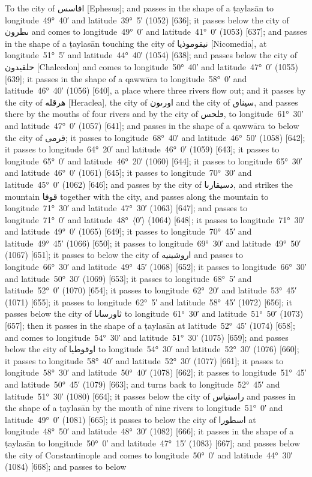 \documentclass[11pt]{article}
\newcommand{\Pg}[1]{\marginpar{\footnotesize #1}}
\newcommand{\Ang}[1]{\ensuremath{#1}}
\begin{document}
To the city of \textarabic{افاسس} [Ephesus]; and passes in the shape of a ṭaylasān to longitude~49°~40′ and latitude~39°~5′ (1052) [636]; it passes below the city of \textarabic{ٮطرون} and comes to longitude~49°~0′ and latitude~41°~0′ (1053) [637]; and passes in the shape of a ṭaylasān touching the city of \textarabic{نيقوموذيا} [Nicomedia], at longitude~51°~5′ and latitude~44°~40′ (1054) [638]; and passes below the city of \textarabic{حلقيدون} [Chalcedon] and comes to longitude~50°~40′ and latitude~47°~0′ (1055) [639]; it passes in the shape of a qawwāra to longitude~58°~0′ and latitude~46°~40′ (1056) [640]\Pg{p. 71}, a place where three rivers flow out; and it passes by the city of \textarabic{هرقله} [Heraclea], the city of \textarabic{اورٮون} and the city of \textarabic{سيناٯ}, and passes there by the mouths of four rivers and by the city of \textarabic{ڡلحس}, to longitude~61°~30′ and latitude~47°~0′ (1057) [641]; and passes in the shape of a qawwāra to below the city of \textarabic{قرمى}; it passes to longitude~68°~40′ and latitude~46°~50′ (1058) [642]; it passes to longitude~64°~20′ and latitude~46°~0′ (1059) [643]; it passes to longitude~65°~0′ and latitude~46°~20′ (1060) [644]; it passes to longitude~65°~30′ and latitude~46°~0′ (1061) [645]; it passes to longitude~70°~30′ and latitude~45°~0′ (1062) [646]; and passes by the city of \textarabic{دسيقارٮا}, and strikes the mountain \textarabic{قوفا} together with the city, and passes along the mountain to longitude~71°~30′ and latitude~47°~30′ (1063) [647]; and passes to longitude~71°~0′ and latitude~48°~\Ang{\langle}0′\Ang{\rangle} (1064) [648]; it passes to longitude~71°~30′ and latitude~49°~0′ (1065) [649]; it passes to longitude~70°~45′ and latitude~49°~45′ (1066) [650]; it passes to longitude~69°~30′ and latitude~49°~50′ (1067) [651]; it passes to below the city of \textarabic{اروشينيه} and passes to longitude~66°~30′ and latitude~49°~45′ (1068) [652]; it passes to longitude~66°~30′ and latitude~50°~30′ (1069) [653]; it passes to longitude~68°~5′ and latitude~52°~0′ (1070) [654]; it passes to longitude~62°~20′ and latitude~53°~45′ (1071) [655]; it passes to longitude~62°~5′ and latitude~58°~45′ (1072) [656]; it passes below the city of \textarabic{ثاورسانا} to longitude~61°~30′ and latitude~51°~50′ (1073) [657]; then it passes in the shape of a ṭaylasān at latitude~52°~45′ (1074) [658]; and comes to longitude~54°~30′ and latitude~51°~30′ (1075) [659]; and passes below the city of \textarabic{اوقوطيا} to longitude~54°~30′ and latitude~52°~30′ (1076) [660]; it passes to longitude~58°~40′ and latitude~52°~30′ (1077) [661]\Pg{p. 72}; it passes to longitude~58°~30′ and latitude~50°~40′ (1078) [662]; it passes to longitude~51°~45′ and latitude~50°~45′ (1079) [663]; and turns back to longitude~52°~45′ and latitude~51°~30′ (1080) [664]; it passes below the city of \textarabic{راسنياس} and passes in the shape of a ṭaylasān by the mouth of nine rivers to longitude~51°~0′ and latitude~49°~0′ (1081) [665]; it passes to below the city of \textarabic{اسطورا} at longitude~48°~50′ and latitude~48°~30′ (1082) [666]; it passes in the shape of a ṭaylasān to longitude~50°~0′ and latitude~47°~15′ (1083) [667]; and passes below the city of Constantinople and comes to longitude~50°~0′ and latitude~44°~30′ (1084) [668]; and passes to below 
\end{document}
